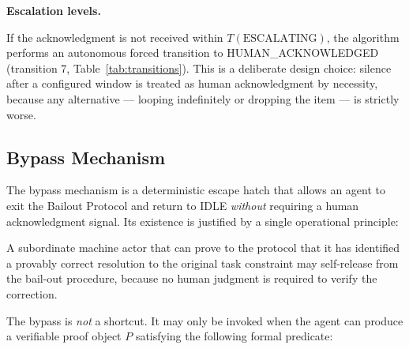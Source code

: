 \bigskip
\noindent\textbf{Escalation levels.}

If the acknowledgment is not received within $T(\text{ESCALATING})$,
the algorithm performs an autonomous forced transition to
HUMAN\_ACKNOWLEDGED (transition 7, Table~\ref{tab:transitions}).
This is a deliberate design choice: silence after a configured window
is treated as human acknowledgment by necessity, because any alternative
--- looping indefinitely or dropping the item --- is strictly worse.


\subsection{Bypass Mechanism}
\label{sec:bypass}

The bypass mechanism is a deterministic escape hatch that allows an agent
to exit the Bailout Protocol and return to IDLE \emph{without} requiring a
human acknowledgment signal.  Its existence is justified by a single
operational principle:

\begin{principle}
A subordinate machine actor that can prove to the protocol that it has
identified a provably correct resolution to the original task constraint
may self-release from the bail-out procedure, because no human judgment
is required to verify the correction.
\end{principle}

\bigskip
The bypass is \emph{not} a shortcut.  It may only be invoked when the
agent can produce a verifiable proof object $P$ satisfying the following
formal predicate:

